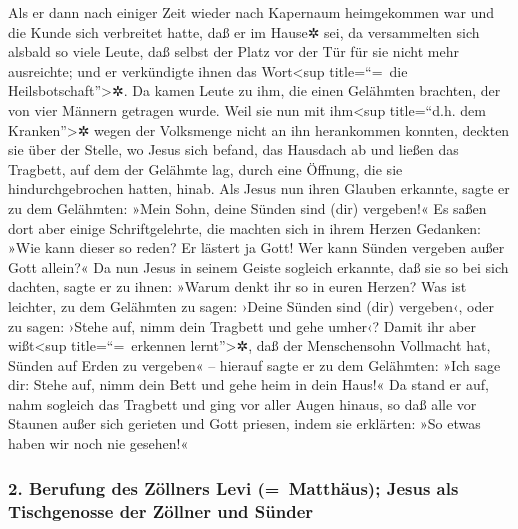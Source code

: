  Als er dann nach einiger Zeit wieder nach Kapernaum
heimgekommen war und die Kunde sich verbreitet hatte, daß er im Hause✲
sei,  da versammelten sich alsbald so viele Leute, daß
selbst der Platz vor der Tür für sie nicht mehr ausreichte; und er
verkündigte ihnen das Wort\textless sup title=``=~die
Heilsbotschaft''\textgreater✲.  Da kamen Leute zu ihm, die
einen Gelähmten brachten, der von vier Männern getragen wurde.
 Weil sie nun mit ihm\textless sup title=``d.h. dem
Kranken''\textgreater✲ wegen der Volksmenge nicht an ihn herankommen
konnten, deckten sie über der Stelle, wo Jesus sich befand, das Hausdach
ab und ließen das Tragbett, auf dem der Gelähmte lag, durch eine
Öffnung, die sie hindurchgebrochen hatten, hinab.  Als
Jesus nun ihren Glauben erkannte, sagte er zu dem Gelähmten: »Mein Sohn,
deine Sünden sind (dir) vergeben!«  Es saßen dort aber
einige Schriftgelehrte, die machten sich in ihrem Herzen Gedanken:
 »Wie kann dieser so reden? Er lästert ja Gott! Wer kann
Sünden vergeben außer Gott allein?«  Da nun Jesus in
seinem Geiste sogleich erkannte, daß sie so bei sich dachten, sagte er
zu ihnen: »Warum denkt ihr so in euren Herzen?  Was ist
leichter, zu dem Gelähmten zu sagen: ›Deine Sünden sind (dir) vergeben‹,
oder zu sagen: ›Stehe auf, nimm dein Tragbett und gehe umher‹?
 Damit ihr aber wißt\textless sup title=``=~erkennen
lernt''\textgreater✲, daß der Menschensohn Vollmacht hat, Sünden auf
Erden zu vergeben« -- hierauf sagte er zu dem Gelähmten: 
»Ich sage dir: Stehe auf, nimm dein Bett und gehe heim in dein Haus!«
 Da stand er auf, nahm sogleich das Tragbett und ging vor
aller Augen hinaus, so daß alle vor Staunen außer sich gerieten und Gott
priesen, indem sie erklärten: »So etwas haben wir noch nie gesehen!«

\hypertarget{berufung-des-zuxf6llners-levi-matthuxe4us-jesus-als-tischgenosse-der-zuxf6llner-und-suxfcnder}{%
\subsubsection{2. Berufung des Zöllners Levi (=~Matthäus); Jesus als
Tischgenosse der Zöllner und
Sünder}\label{berufung-des-zuxf6llners-levi-matthuxe4us-jesus-als-tischgenosse-der-zuxf6llner-und-suxfcnder}}

